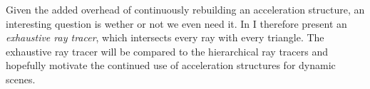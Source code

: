 Given the added overhead of continuously rebuilding an acceleration
structure, an interesting question is wether or not we even need
it. In  I therefore present an
\textit{exhaustive ray tracer}, which intersects every ray with every
triangle. The exhaustive ray tracer will be compared to the
hierarchical ray tracers and hopefully motivate the continued use of
acceleration structures for dynamic scenes.






